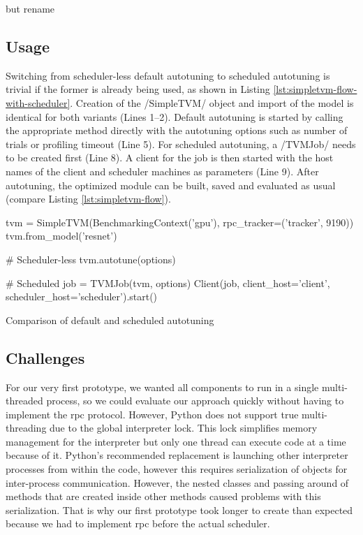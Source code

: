  but rename

\subsection{Usage}
Switching from scheduler-less default autotuning to scheduled autotuning is trivial if the former is already being used, as shown in Listing \ref{lst:simpletvm-flow-with-scheduler}. Creation of the \pythoninline/SimpleTVM/ object and import of the model is identical for both variants (Lines 1--2). Default autotuning is started by calling the appropriate method directly with the autotuning options such as number of trials or profiling timeout (Line 5). For scheduled autotuning, a \pythoninline/TVMJob/ needs to be created first (Line 8). A client for the job is then started with the host names of the client and scheduler machines as parameters (Line 9). After autotuning, the optimized module can be built, saved and evaluated as usual (compare Listing \ref{lst:simpletvm-flow}).
\begin{listing}[h]
\begin{pythoncode}
tvm = SimpleTVM(BenchmarkingContext('gpu'), rpc_tracker=('tracker', 9190))
tvm.from_model('resnet')

# Scheduler-less
tvm.autotune(options)

# Scheduled
job = TVMJob(tvm, options)
Client(job, client_host='client', scheduler_host='scheduler').start()
\end{pythoncode}
\unskip
\caption{Comparison of default and scheduled autotuning}
\label{lst:simpletvm-flow-with-scheduler}
\end{listing}

\subsection{Challenges}
For our very first prototype, we wanted all components to run in a single multi-threaded process, so we could evaluate our approach quickly without having to implement the \gls{rpc} protocol. However, Python does not support true multi-threading due to the global interpreter lock. This lock simplifies memory management for the interpreter but only one thread can execute code at a time because of it. Python's recommended replacement is launching other interpreter processes from within the code, however this requires serialization of objects for inter-process communication. However, the nested classes and passing around of methods that are created inside other methods caused problems with this serialization. That is why our first prototype took longer to create than expected because we had to implement \gls{rpc} before the actual scheduler.

